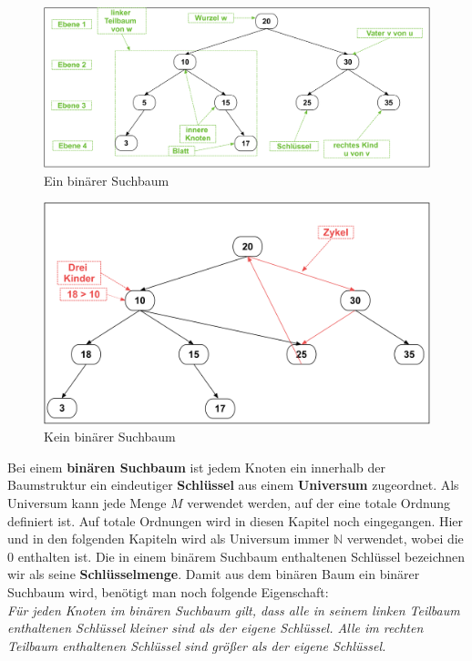 \documentclass[a4paper,12pt]{article}
\begin{document}
\begin{figure}[h]
	\centering
	\includegraphics[width= 1\textwidth]{"Medien/Einleitung/ioSuchbaum"}
	\caption{Ein binärer Suchbaum }
	\label{fig:ioSuchbaum}
\end{figure}
\begin{figure}[h]
	\centering
	\includegraphics[width= 1\textwidth]{"Medien/Einleitung/nioSuchbaum"}
	\caption{Kein binärer Suchbaum }
	\label{fig:nioSuchbaum}
\end{figure}

\noindent Bei einem \textbf{binären Suchbaum} ist jedem Knoten ein innerhalb der Baumstruktur ein eindeutiger \textbf{Schlüssel} aus einem \textbf{Universum} zugeordnet. Als Universum kann jede Menge $M$ verwendet werden, auf der eine totale Ordnung definiert ist. Auf totale Ordnungen wird in diesen Kapitel noch eingegangen. Hier und in den folgenden Kapiteln wird als Universum immer $\mathbb{N}$ verwendet, wobei die $0$ enthalten ist. Die in einem binärem Suchbaum enthaltenen Schlüssel bezeichnen wir als seine \textbf{Schlüsselmenge}.  Damit aus dem binären Baum ein binärer Suchbaum wird, benötigt man noch folgende Eigenschaft:\\
\textit{Für jeden Knoten im binären Suchbaum gilt, dass alle in seinem linken Teilbaum enthaltenen Schlüssel kleiner sind als der eigene Schlüssel. Alle im rechten Teilbaum enthaltenen Schlüssel sind größer als der eigene Schlüssel.} \\
\end{document}
